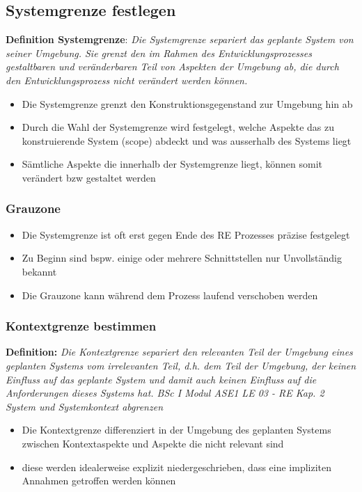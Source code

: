 \documentclass{report}
\theoremstyle{definition}
\theoremstyle{example}
\begin{document}
\subsection{Systemgrenze festlegen}
\textbf{Definition Systemgrenze}: \textit{Die Systemgrenze separiert das geplante System von seiner Umgebung.
Sie grenzt den im Rahmen des Entwicklungsprozesses gestaltbaren und
veränderbaren Teil von Aspekten der Umgebung ab, die durch den
Entwicklungsprozess nicht verändert werden können.}
\begin{itemize}
   \item Die Systemgrenze grenzt den Konstruktionsgegenstand zur Umgebung hin ab
   \item Durch die Wahl der Systemgrenze wird festgelegt, welche Aspekte das zu konstruierende System (scope) abdeckt und was ausserhalb des Systems liegt
   \item Sämtliche Aspekte die innerhalb der Systemgrenze liegt, können somit verändert bzw gestaltet werden
\end{itemize}

\subsubsection{Grauzone}
\begin{itemize}
   \item Die Systemgrenze ist oft erst gegen Ende des RE Prozesses präzise festgelegt
   \item Zu Beginn sind bspw. einige oder mehrere Schnittstellen nur Unvollständig bekannt
   \item Die Grauzone kann während dem Prozess laufend verschoben werden
\end{itemize}

\subsubsection{Kontextgrenze bestimmen}
\textbf{Definition:} \textit{Die Kontextgrenze separiert den relevanten Teil der Umgebung eines
geplanten Systems vom irrelevanten Teil, d.h. dem Teil der Umgebung,
der keinen Einfluss auf das geplante System und damit auch keinen
Einfluss auf die Anforderungen dieses Systems hat.
BSc I Modul ASE1 LE 03 - RE Kap. 2 System und Systemkontext abgrenzen}
\begin{itemize}
   \item Die Kontextgrenze differenziert in der Umgebung des geplanten Systems zwischen Kontextaspekte und Aspekte die nicht relevant sind
   \item diese werden idealerweise explizit niedergeschrieben, dass eine impliziten Annahmen getroffen werden können
\end{itemize}
\end{document}
